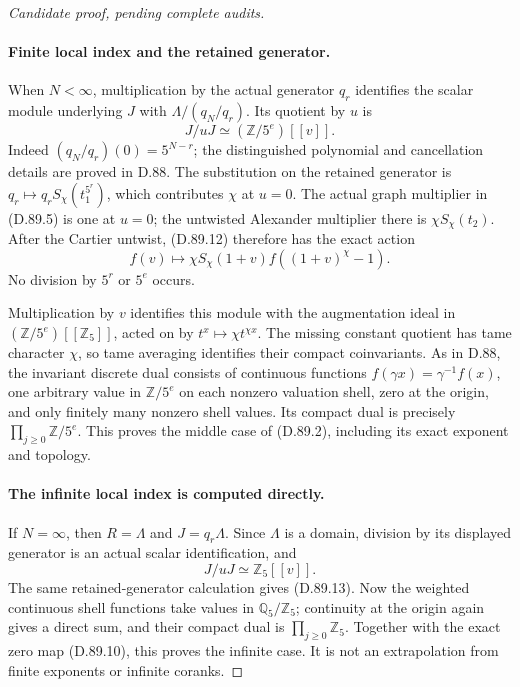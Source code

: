 \begin{proof}[Candidate proof, pending complete audits]
\paragraph{Finite local index and the retained generator.}
When \(N<\infty\), multiplication by the actual generator
\(q_r\) identifies the scalar module underlying \(J\)
with \(\Lambda/(q_N/q_r)\). Its quotient by \(u\) is
\[
                         J/uJ\simeq(\mathbb Z/5^e)[[v]].
                                                               \tag{D.89.12}
\]
Indeed \((q_N/q_r)(0)=5^{N-r}\); the distinguished
polynomial and cancellation details are proved in D.88.
The substitution on the retained generator is
\(q_r\mapsto q_rS_\chi(t_1^{5^r})\), which contributes
\(\chi\) at \(u=0\). The actual graph multiplier in
(D.89.5) is one at \(u=0\); the untwisted Alexander
multiplier there is \(\chi S_\chi(t_2)\).
After the Cartier untwist, (D.89.12) therefore has the exact
action
\[
       f(v)\longmapsto\chi S_\chi(1+v)
                       f((1+v)^\chi-1).                \tag{D.89.13}
\]
No division by \(5^r\) or \(5^e\) occurs.

Multiplication by \(v\) identifies this module with the
augmentation ideal in
\((\mathbb Z/5^e)[[\mathbb Z_5]]\), acted on by
\(t^x\mapsto\chi t^{\chi x}\). The missing constant
quotient has tame character \(\chi\), so tame averaging
identifies their compact coinvariants. As in D.88, the
invariant discrete dual consists of continuous functions
\(f(\gamma x)=\gamma^{-1}f(x)\), one arbitrary value
in \(\mathbb Z/5^e\) on each nonzero valuation shell,
zero at the origin, and only finitely many nonzero shell
values. Its compact dual is precisely
\(\prod_{j\ge0}\mathbb Z/5^e\). This proves the middle
case of (D.89.2), including its exact exponent and topology.

\paragraph{The infinite local index is computed directly.}
If \(N=\infty\), then \(R=\Lambda\) and
\(J=q_r\Lambda\). Since \(\Lambda\) is a domain,
division by its displayed generator is an actual scalar
identification, and
\[
                            J/uJ\simeq\mathbb Z_5[[v]].
                                                               \tag{D.89.14}
\]
The same retained-generator calculation gives (D.89.13).
Now the weighted continuous shell functions take values in
\(\mathbb Q_5/\mathbb Z_5\); continuity at the origin
again gives a direct sum, and their compact dual is
\(\prod_{j\ge0}\mathbb Z_5\). Together with the exact
zero map (D.89.10), this proves the infinite case. It is not
an extrapolation from finite exponents or infinite coranks.


\end{proof}
